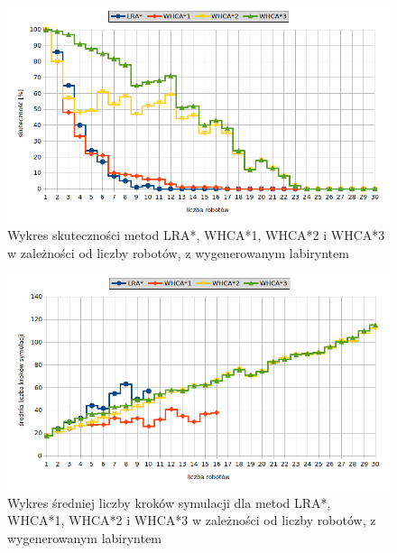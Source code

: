 
\begin{figure}[H]
	\centering
	\includegraphics[width=0.9\columnwidth]{img/plots/test-steps-maze-robots-eff}
	\caption{Wykres skuteczności metod LRA*, WHCA*1, WHCA*2 i WHCA*3 w zależności od liczby robotów, z wygenerowanym labiryntem}
	\label{fig:test-steps-maze-robots-eff}
\end{figure}
\begin{figure}[H]
	\centering
	\includegraphics[width=0.9\columnwidth]{img/plots/test-steps-maze-robots-steps}
	\caption{Wykres średniej liczby kroków symulacji dla metod LRA*, WHCA*1, WHCA*2 i WHCA*3 w zależności od liczby robotów, z wygenerowanym labiryntem}
	\label{fig:test-steps-maze-robots-steps}
\end{figure}
